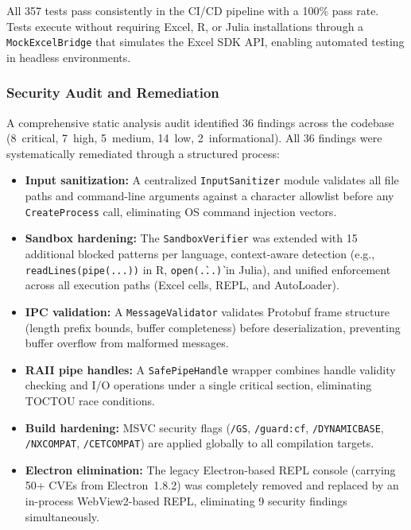 All 357 tests pass consistently in the CI/CD pipeline with a 100\% pass rate. Tests execute without requiring Excel, R, or Julia installations through a \texttt{MockExcelBridge} that simulates the Excel SDK API, enabling automated testing in headless environments.

\subsubsection{Security Audit and Remediation}

A comprehensive static analysis audit identified 36 findings across the codebase (8~critical, 7~high, 5~medium, 14~low, 2~informational). All 36 findings were systematically remediated through a structured process:

\begin{itemize}
    \item \textbf{Input sanitization:} A centralized \texttt{InputSanitizer} module validates all file paths and command-line arguments against a character allowlist before any \texttt{CreateProcess} call, eliminating OS command injection vectors.
    \item \textbf{Sandbox hardening:} The \texttt{SandboxVerifier} was extended with 15 additional blocked patterns per language, context-aware detection (e.g., \texttt{readLines(pipe(...))} in R, \texttt{open(\`...\`)} in Julia), and unified enforcement across all execution paths (Excel cells, REPL, and AutoLoader).
    \item \textbf{IPC validation:} A \texttt{MessageValidator} validates Protobuf frame structure (length prefix bounds, buffer completeness) before deserialization, preventing buffer overflow from malformed messages.
    \item \textbf{RAII pipe handles:} A \texttt{SafePipeHandle} wrapper combines handle validity checking and I/O operations under a single critical section, eliminating TOCTOU race conditions.
    \item \textbf{Build hardening:} MSVC security flags (\texttt{/GS}, \texttt{/guard:cf}, \texttt{/DYNAMICBASE}, \texttt{/NXCOMPAT}, \texttt{/CETCOMPAT}) are applied globally to all compilation targets.
    \item \textbf{Electron elimination:} The legacy Electron-based REPL console (carrying 50+ CVEs from Electron~1.8.2) was completely removed and replaced by an in-process WebView2-based REPL, eliminating 9 security findings simultaneously.
\end{itemize}

